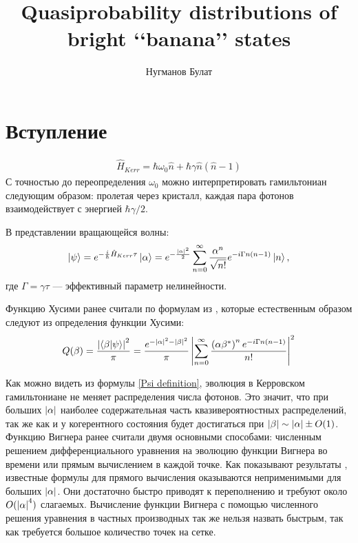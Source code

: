 \documentclass[a4paper, 12pt]{article}
\author{Нугманов Булат}
\title{Quasiprobability distributions of bright ‘‘banana’’ states}
\newenvironment{eqw}{\begin{equation} \begin{aligned}}   
    {\end{aligned}    \end{equation}}
\begin{document}
\maketitle
\section*{Вступление}
\begin{eqw}\label{Hamiltonian}
    \hat H_{Kerr} = \hbar \omega_0 \hat n + \hbar\gamma \hat n(\hat n - 1)
\end{eqw}
С точностью до переопределения $\omega_0$ можно интерпретировать гамильтониан следующим образом: пролетая через кристалл, каждая пара фотонов взаимодействует с энергией $\hbar\gamma / 2$.

В представлении вращающейся волны:
\begin{eqw}\label{Psi definition}
    \ket{\psi} = e^{-\frac{i}{\hbar}\hat H_{Kerr}\tau}\ket{\alpha} = e^{-\frac{\abs{\alpha}^2}{2}}\sum\limits_{n=0}^{\infty}\frac{\alpha^n}{\sqrt{n!}}e^{-i\Gamma n(n-1)}\ket{n},
\end{eqw}
где $\Gamma = \gamma \tau$ --- эффективный параметр нелинейности.

Функцию Хусими ранее считали по формулам из \cite{milburn1986quantum}, которые естественным образом следуют из определения функции Хусими:
\begin{eqw}\label{Husimi by def}
    Q(\beta) = \frac{\abs{\braket{\beta}{\psi}}^2}{\pi} = \frac{e^{-\abs{\alpha}^2-\abs{\beta}^2}}{\pi}\left|
	\sum\limits_{n = 0}^{\infty}\dfrac{\left(\alpha \beta^*\right)^n e^{-i \Gamma n(n-1)}}{n!}\right|^2
\end{eqw}

Как можно видеть из формулы \ref{Psi definition}, эволюция в Керровском гамильтониане не меняет распределения числа фотонов. Это значит, что при больших $\abs{\alpha}$ наиболее содержательная часть квазивероятностных распределений, так же как и у когерентного состояния будет достигаться при $\abs{\beta}\sim\abs{\alpha} \pm O(1)$.
Функцию Вигнера ранее считали двумя основными способами: численным решением дифференциального уравнения на эволюцию функции Вигнера во времени или прямым вычислением в каждой точке. Как показывают результаты \cite{stobinska2008wigner}, известные формулы для прямого вычисления оказываются неприменимыми для больших $\abs{\alpha}$. Они достаточно быстро приводят к переполнению и требуют около $O(\abs{\alpha}^4)$ слагаемых. Вычисление функции Вигнера с помощью численного решения уравнения в частных производных так же нельзя назвать быстрым, так как требуется большое количество точек на сетке.
\end{document}
